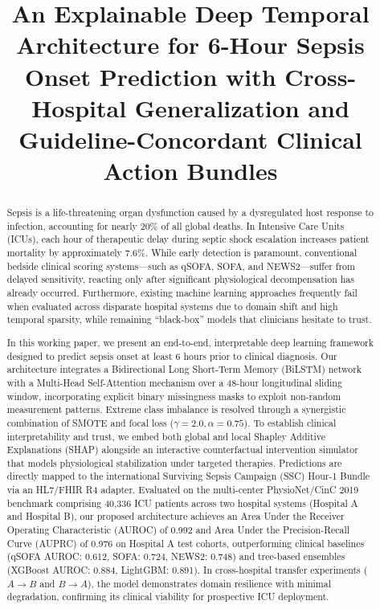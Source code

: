 \documentclass[conference]{IEEEtran}
\begin{document}
\title{An Explainable Deep Temporal Architecture for 6-Hour Sepsis Onset Prediction with Cross-Hospital Generalization and Guideline-Concordant Clinical Action Bundles}

\author{
}

\maketitle

\begin{abstract}
Sepsis is a life-threatening organ dysfunction caused by a dysregulated host response to infection, accounting for nearly 20\% of all global deaths. In Intensive Care Units (ICUs), each hour of therapeutic delay during septic shock escalation increases patient mortality by approximately 7.6\%. While early detection is paramount, conventional bedside clinical scoring systems---such as qSOFA, SOFA, and NEWS2---suffer from delayed sensitivity, reacting only after significant physiological decompensation has already occurred. Furthermore, existing machine learning approaches frequently fail when evaluated across disparate hospital systems due to domain shift and high temporal sparsity, while remaining ``black-box'' models that clinicians hesitate to trust.

In this working paper, we present an end-to-end, interpretable deep learning framework designed to predict sepsis onset at least 6 hours prior to clinical diagnosis. Our architecture integrates a Bidirectional Long Short-Term Memory (BiLSTM) network with a Multi-Head Self-Attention mechanism over a 48-hour longitudinal sliding window, incorporating explicit binary missingness masks to exploit non-random measurement patterns. Extreme class imbalance is resolved through a synergistic combination of SMOTE and focal loss ($\gamma=2.0, \alpha=0.75$). To establish clinical interpretability and trust, we embed both global and local Shapley Additive Explanations (SHAP) alongside an interactive counterfactual intervention simulator that models physiological stabilization under targeted therapies. Predictions are directly mapped to the international Surviving Sepsis Campaign (SSC) Hour-1 Bundle via an HL7/FHIR R4 adapter. Evaluated on the multi-center PhysioNet/CinC 2019 benchmark comprising 40,336 ICU patients across two hospital systems (Hospital A and Hospital B), our proposed architecture achieves an Area Under the Receiver Operating Characteristic (AUROC) of 0.992 and Area Under the Precision-Recall Curve (AUPRC) of 0.976 on Hospital A test cohorts, outperforming clinical baselines (qSOFA AUROC: 0.612, SOFA: 0.724, NEWS2: 0.748) and tree-based ensembles (XGBoost AUROC: 0.884, LightGBM: 0.891). In cross-hospital transfer experiments ($A \to B$ and $B \to A$), the model demonstrates domain resilience with minimal degradation, confirming its clinical viability for prospective ICU deployment.
\end{abstract}
\end{document}
